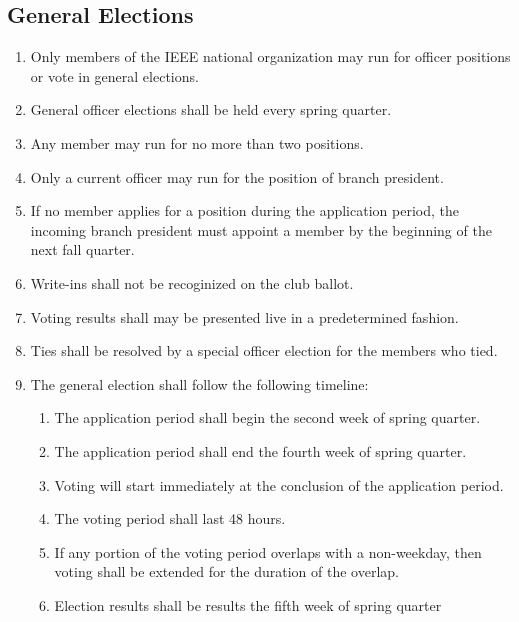 \documentclass{article}
\begin{document}
\subsection{General Elections}
\begin{enumerate}
\item Only members of the IEEE national organization may run for officer positions or vote in general elections.
\item General officer elections shall be held every spring quarter. 
\item Any member may run for no more than two positions.
\item Only a current officer may run for the position of branch president.
\item If no member applies for a position during the application period, the incoming branch president must appoint a member by the beginning of the next fall quarter.
\item Write-ins shall not be recoginized on the club ballot.
\item Voting results shall may be presented live in a predetermined fashion.
\item Ties shall be resolved by a special officer election for the members who tied.
\item The general election shall follow the following timeline:
  \begin{enumerate}
  \item The application period shall begin the second week of spring quarter.
  \item The application period shall end the fourth week of spring quarter.
  \item Voting will start immediately at the conclusion of the application period.
  \item The voting period shall last 48 hours.
  \item If any portion of the voting period overlaps with a non-weekday, then voting shall be extended for the duration of the overlap.
  \item Election results shall be results the fifth week of spring quarter
  \end{enumerate}
\end{enumerate}
\end{document}
